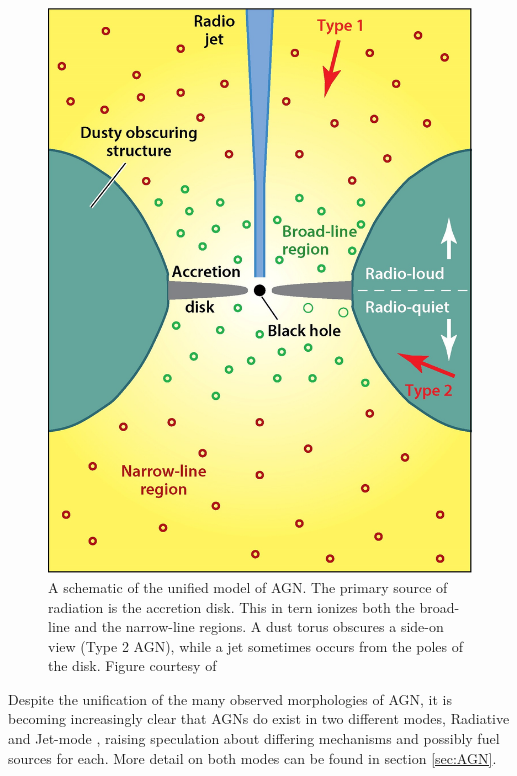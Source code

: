 \begin{figure}
	\centering
	\includegraphics[width=\textwidth]{introduction/unifiedAGN.jpeg}
	\caption[Schematic of unified model of AGN]{A schematic of the unified model of AGN. The primary source of radiation is the accretion disk. This in tern ionizes both the broad-line and the narrow-line regions. A dust torus obscures a side-on view (Type 2 AGN), while a jet sometimes occurs from the poles of the disk. Figure courtesy of \citet{Heckman2014}}
	\label{fig:UnifiedAGN}
\end{figure}

Despite the unification of the many observed morphologies of AGN, it is becoming increasingly clear that AGNs do exist in two different modes, Radiative and Jet-mode \citep{Antonucci2012}, raising speculation about differing mechanisms and possibly fuel sources for each. More detail on both modes can be found in section \ref{sec:AGN}. 

